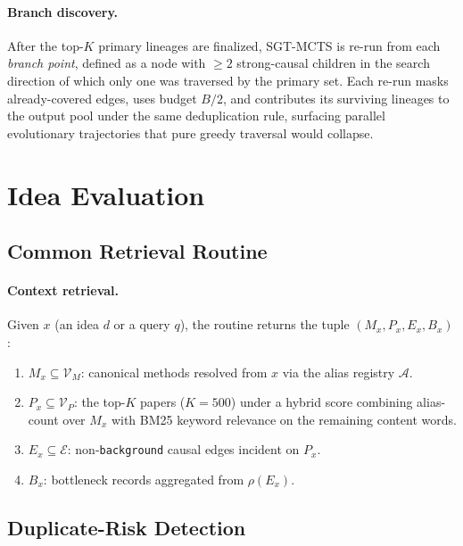 \documentclass{llmxive}
\begin{document}
\paragraph{Branch discovery.}
After the top-$K$ primary lineages are finalized, SGT-MCTS is re-run from each \emph{branch point}, defined as a
node with $\ge 2$ strong-causal children in the search direction of which only one was traversed by the primary
set. Each re-run masks already-covered edges, uses budget $B/2$, and contributes its surviving lineages to the
output pool under the same deduplication rule, surfacing parallel evolutionary trajectories that pure greedy
traversal would collapse.


\section{Idea Evaluation}
\label{app:eval}

\subsection{Common Retrieval Routine}
\label{app:retrieval}

\paragraph{Context retrieval.}
Given $x$ (an idea $d$ or a query $q$), the routine returns the tuple $(M_x, P_x, E_x, B_x)$:
\begin{enumerate}
\item $M_x \subseteq \mathcal{V}_M$: canonical methods resolved from $x$ via the alias registry $\mathcal{A}$.
\item $P_x \subseteq \mathcal{V}_P$: the top-$K$ papers ($K=500$) under a hybrid score combining alias-count over
$M_x$ with BM25 keyword relevance on the remaining content words.
\item $E_x \subseteq \mathcal{E}$: non-\texttt{background} causal edges incident on $P_x$.
\item $B_x$: bottleneck records aggregated from $\rho(E_x)$.
\end{enumerate}

\subsection{Duplicate-Risk Detection}
\end{document}
